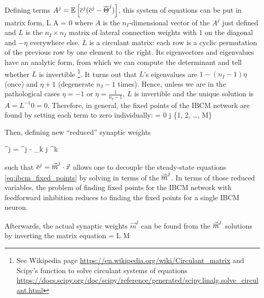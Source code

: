Defining terms $A^j = \mathbb{E}\left[ \overline{c}^j(\overline{c}^j - \overline{\Theta}^j) \right]$, this system of equations can be put in matrix form, 
\beq
	L A = 0
	\label{eq:ibcm_general_steady_matrix}
\eeq
where $A$ is the $n_I$-dimensional vector of the $A^j$ just defined and $L$ is the $n_I \times n_I$ matrix of lateral connection weights with $1$ on the diagonal and $-\eta$ everywhere else. $L$ is a circulant matrix: each row is a cyclic permutation of the previous row by one element to the right. Its eigenvectors and eigenvalues have an analytic form, from which we can compute the determinant and tell whether $L$ is invertible{\protect
\footnote{See Wikipedia page \url{https://en.wikipedia.org/wiki/Circulant_matrix} and Scipy's function to solve circulant systems of equations \url{https://docs.scipy.org/doc/scipy/reference/generated/scipy.linalg.solve_circulant.html} 
}}. It turns out that $L$'s eigenvalues are $1 - (n_I-1)\eta$ (once) and $\eta + 1$ (degenerate $n_I-1$ times). Hence, unless we are in the pathological cases $\eta = -1$ or $\eta = \frac{1}{n_I-1}$, $L$ is invertible and the unique solution is $A = L^{-1} 0 = 0$. Therefore, in general, the fixed points of the IBCM network are found by setting each term to zero individually:
\beq
	 = 0 \quad \forall j \in \{1, 2, \ldots, M\}
	\label{eq:ibcm_fixed_points}
\eeq

Then, defining new ``reduced'' synaptic weights

\beq
	^j = ^j - \eta \sum_{k \neq j} ^k 
	\label{eq:reduced_synaptic_weights}
\eeq

such that $\overline{c}^j = \vec{\overline{m}}^j \cdot \vec{x}$ allows one to decouple the steady-state equations \eqref{eq:ibcm_fixed_points} by solving in terms of the $\vec{\overline{m}}^j$. In terms of those reduced variables, the problem of finding fixed points for the IBCM network with feedforward inhibition reduces to finding the fixed points for a single IBCM neuron. 



Afterwards, the actual synaptic weights $\vec{m}^j$ can be found from the $\vec{\overline{m}}^j$ solutions by inverting the matrix equation
\beq
	 = L M
\eeq

